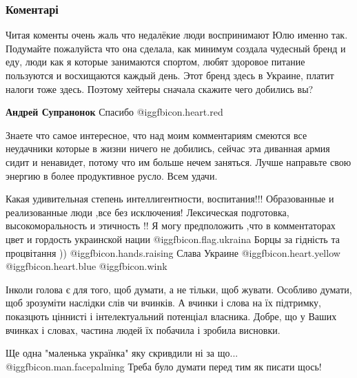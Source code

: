  
 
 
 
 
\subsubsection{Коментарі}

\begin{itemize} %

Читая коменты очень жаль что недалёкие люди воспринимают Юлю именно так.
Подумайте пожалуйста что она сделала, как минимум создала чудесный бренд и еду,
люди как я которые занимаются спортом, любят здоровое питание пользуются и
восхищаются каждый день. Этот бренд здесь в Украине, платит налоги тоже здесь.
Поэтому хейтеры сначала скажите чего добились вы?

\begin{itemize} %
\textbf{Андрей Супранонок} Спасибо @igg{fbicon.heart.red}


Знаете что самое интересное, что над моим комментариям смеются все неудачники
которые в жизни ничего не добились, сейчас эта диванная армия
сидит и ненавидет, потому что им больше нечем заняться. Лучше
направьте свою энергию в более продуктивное русло. Всем удачи.

\end{itemize} %


\obeycr
Какая удивительная степень интеллигентности, воспитания!!!
Образованные и реализованные люди ,все без исключения!
Лексическая подготовка,
высокоморальность и этичность !!
Я могу предположить ,что в комментаторах цвет и гордость украинской нации @igg{fbicon.flag.ukraina}
Борцы за гідність та процвітання )) @igg{fbicon.hands.raising} 
Слава Украине @igg{fbicon.heart.yellow}  @igg{fbicon.heart.blue} 
 @igg{fbicon.wink} 
\restorecr


Інколи голова є для того, щоб думати, а не тільки, щоб жувати. Особливо думати,
щоб зрозуміти наслідки слів чи вчинків. А вчинки і слова на їх підтримку,
показцють ціннисті і інтелектуальний потенціал власника. Добре, що у Ваших
вчинках і словах, частина людей їх побачила і зробила висновки.


Ще одна "маленька українка" яку скривдили ні за що...  @igg{fbicon.man.facepalming} 
Треба було думати перед тим як писати щось!

\end{itemize} %
